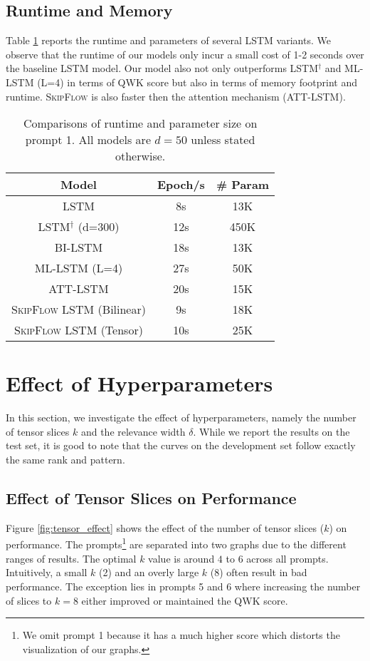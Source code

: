 \documentclass[letterpaper]{article}
\begin{document}
\subsection{Runtime and Memory}
Table \ref{tab:runtime} reports the runtime and parameters of several LSTM variants. We observe that the runtime of our models only incur a small cost of 1-2 seconds over the baseline LSTM model. Our model also not only outperforms LSTM$^{\dagger}$ and ML-LSTM (L=4) in terms of QWK score but also in terms of memory footprint and runtime. \textsc{SkipFlow} is also faster then the attention mechanism (ATT-LSTM).
\begin{table}[htbp]
  \centering
\small
    \begin{tabular}{|c|c|c|}
    \hline
    Model & Epoch/s & \# Param \\
    \hline
    LSTM  &  8s     &  13K\\
        LSTM$^{\dagger}$ (d=300)  & 12s     & 450K \\
        BI-LSTM  & 18s & 13K \\
        ML-LSTM (L=4)  & 27s & 50K \\
        ATT-LSTM & 20s & 15K  \\
         \textsc{SkipFlow} LSTM (Bilinear) & 9s       &  18K\\
        \textsc{SkipFlow} LSTM (Tensor)  & 10s      & 25K \\
        \hline
    \end{tabular}\caption{Comparisons of runtime and parameter size on prompt 1. All models are $d=50$ unless stated otherwise.}
  \label{tab:runtime}\end{table}


\section{Effect of Hyperparameters}
In this section, we investigate the effect of hyperparameters, namely the number of tensor slices $k$ and the relevance width $\delta$. While we report the results on the test set, it is good to note that the curves on the development set follow exactly the same rank and pattern. 

\subsection{Effect of Tensor Slices on Performance}

Figure \ref{fig:tensor_effect} shows the effect of the number of tensor slices ($k$) on performance. The prompts\footnote{We omit prompt 1 because it has a much higher score which distorts the visualization of our graphs.} are separated into two graphs due to the different ranges of results. The optimal $k$ value is around $4$ to $6$ across all prompts. Intuitively, a small $k$ (2) and an overly large $k$ (8) often result in bad performance. The exception lies in prompts 5 and 6 where increasing the number of slices to $k=8$ either improved or maintained the QWK score. 
\end{document}
